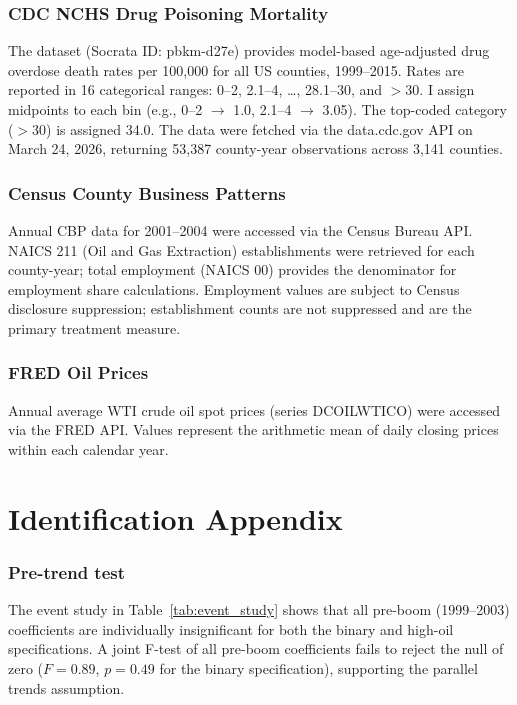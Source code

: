 \documentclass[12pt]{article}
\begin{document}
\subsubsection*{CDC NCHS Drug Poisoning Mortality} The dataset (Socrata ID: pbkm-d27e) provides model-based age-adjusted drug overdose death rates per 100,000 for all US counties, 1999--2015. Rates are reported in 16 categorical ranges: 0--2, 2.1--4, \ldots, 28.1--30, and $>$30. I assign midpoints to each bin (e.g., 0--2 $\to$ 1.0, 2.1--4 $\to$ 3.05). The top-coded category ($>$30) is assigned 34.0. The data were fetched via the data.cdc.gov API on March 24, 2026, returning 53,387 county-year observations across 3,141 counties.

\subsubsection*{Census County Business Patterns} Annual CBP data for 2001--2004 were accessed via the Census Bureau API. NAICS 211 (Oil and Gas Extraction) establishments were retrieved for each county-year; total employment (NAICS 00) provides the denominator for employment share calculations. Employment values are subject to Census disclosure suppression; establishment counts are not suppressed and are the primary treatment measure.

\subsubsection*{FRED Oil Prices} Annual average WTI crude oil spot prices (series DCOILWTICO) were accessed via the FRED API. Values represent the arithmetic mean of daily closing prices within each calendar year.

\section{Identification Appendix}

\subsubsection*{Pre-trend test} The event study in Table~\ref{tab:event_study} shows that all pre-boom (1999--2003) coefficients are individually insignificant for both the binary and high-oil specifications. A joint F-test of all pre-boom coefficients fails to reject the null of zero ($F = 0.89$, $p = 0.49$ for the binary specification), supporting the parallel trends assumption.
\end{document}
